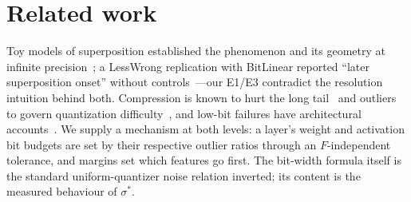 \documentclass{article}
\begin{document}
\begin{table}[h]\centering\footnotesize
\caption{Key results (CIs: seed bootstrap for toy models, matrix bootstrap for GPT-2; ``prereg.'' = preregistered value;
``P2 form'' = P2's functional form applied post hoc to a new arm, not preregistered coverage; rows marked exploratory were not preregistered).}
\label{tab:key}
\setlength{\tabcolsep}{4pt}
\end{table}
\section{Related work}
Toy models of superposition established the phenomenon and its geometry at infinite precision~\cite{elhage2022toy}; a
LessWrong replication with BitLinear reported ``later superposition onset'' without controls~\cite{bitnets}---our
E1/E3 contradict the resolution intuition behind both. Compression is known to hurt the long tail~\cite{hooker2019,hooker2020}
and outliers to govern quantization difficulty~\cite{dettmers2022,xiao2023,lin2024awq,frantar2022gptq}, and low-bit failures have architectural accounts~\cite{inputs2025}. We supply a mechanism at both levels: a layer's weight and activation bit budgets are set by their respective outlier
ratios through an $F$-independent tolerance, and margins set which features go first. The bit-width formula itself is
the standard uniform-quantizer noise relation inverted; its content is the measured behaviour of $\sigma^*$.
\end{document}
